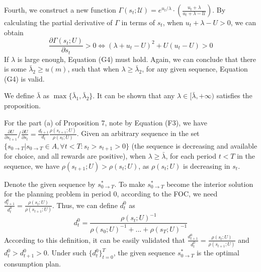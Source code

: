 \documentclass[
  12pt,
]{article}
\begin{document}
Fourth, we construct a new function
\(\Gamma(s_t;\mathcal{U})=e^{u_t/\lambda}\cdot\left(\frac{u_t+\lambda}{u_t+\lambda -\mathcal{U}}\right)\).
By calculating the partial derivative of \(\Gamma\) in terms of \(s_t\),
when \(u_t+\lambda-U>0\), we can obtain\[
\tag{G4} \frac{\partial\Gamma(s_t;U)}{\partial s_t}>0 \Longleftrightarrow (\lambda +u_t-U)^2+U(u_t-U)>0
\]If \(\lambda\) is large enough, Equation (G4) must hold. Again, we can
conclude that there is some \(\bar{\lambda}_2\geq u(m)\), such that when
\(\lambda \geq \bar{\lambda}_2\), for any given sequence, Equation (G4)
is valid.

We define \(\bar{\lambda}\) as
\(\max\{\bar{\lambda}_1,\bar{\lambda}_2\}\). It can be shown that any
\(\lambda\in[\bar{\lambda},+\infty)\) satisfies the proposition.

For the part (a) of Proposition 7, note by Equation (F3), we have
\(\frac{\partial U}{\partial s_{t+1}}/\frac{\partial U}{\partial s_t}=\frac{d_{t+1}}{d_t} \frac{\rho(s_{t+1};U)}{\rho(s_t;U)}\).
Given an arbitrary sequence in the set
\(\{s_{0\rightarrow T}|s_{0\rightarrow T}\in A, \forall t<T:s_t>s_{t+1}>0\}\)
(the sequence is decreasing and available for choice, and all rewards
are positive), when \(\lambda \geq \bar{\lambda}\), for each period
\(t<T\) in the sequence, we have \(\rho(s_{t+1};U)>\rho(s_t;U)\), as
\(\rho(s_t;U)\) is decreasing in \(s_t\).

Denote the given sequence by \(s_{0\rightarrow T}^*\). To make
\(s_{0\rightarrow T}^*\) become the interior solution for the planning
problem in period 0, according to the FOC, we need
\(\frac{d_{t+1}^0}{d_t^0}=\frac{\rho(s_t;U)}{\rho(s_{t+1};U)}\). Thus,
we can define \(d_t^0\) as\[
d_t^0 = \frac{\rho(s_t;U)^{-1}}{\rho(s_0;U)^{-1}+...+\rho(s_T;U)^{-1}}
\]According to this definition, it can be easily validated that
\(\frac{d_{t+1}^0}{d_t^0}=\frac {\rho(s_t;U)}{\rho(s_{t+1};U)}\) and
\(d_t^0>d_{t+1}^0>0\). Under such \(\{d_t^0\}_{t=0}^T\), the given
sequence \(s_{0\rightarrow T}^*\) is the optimal consumption plan.
\end{document}
